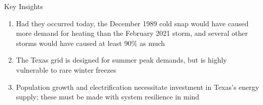 \begin{block}{Key Insights}
    \begin{enumerate}
        \item Had they occurred today, the December 1989 cold snap would have caused more demand for heating than the February 2021 storm, and several other storms would have caused at least 90\% as much
        \item The Texas grid is designed for summer peak demands, but is highly vulnerable to rare winter freezes
        \item Population growth and electrification necessitate investment in Texas's energy supply; these must be made with system resilience in mind
    \end{enumerate}
\end{block}